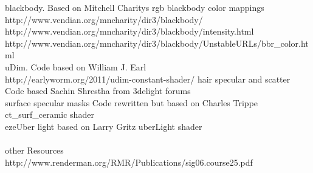\documentclass[final,letterpaper,twoside,12pt]{report}
\begin{document}
\begin{thebibliography}{99}
 blackbody. Based on Mitchell Charitys rgb blackbody color mappings\\
http://www.vendian.org/mncharity/dir3/blackbody/ \\
http://www.vendian.org/mncharity/dir3/blackbody/intensity.html \\
http://www.vendian.org/mncharity/dir3/blackbody/UnstableURLs/bbr\_color.html \\
 uDim. Code based on William J. Earl\\
http://earlyworm.org/2011/udim-constant-shader/
 hair specular and scatter Code based Sachin Shrestha from 3delight forums\\
 surface specular masks Code rewritten but based on Charles Trippe ct\_surf\_ceramic shader\\
 ezeUber light based on Larry Gritz uberLight shader \\
\\
\noindent other Resources
http://www.renderman.org/RMR/Publications/sig06.course25.pdf\\
\end{thebibliography}
\end{document}
